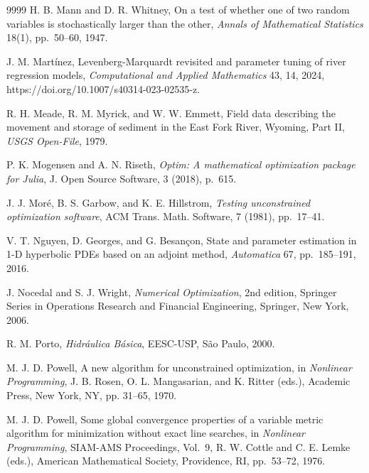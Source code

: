 \documentclass{article}
\begin{document}
\begin{thebibliography}{9999}
 H. B. Mann and D. R. Whitney, On a test of whether one of two random
variables is stochastically larger than the other, {\it Annals of Mathematical Statistics} 18(1), pp.~50--60, 1947.

 J. M. Mart\'inez, Levenberg-Marquardt revisited and parameter tuning of
river regression models, {\it Computational and Applied Mathematics} 43, 14, 2024,
https://doi.org/10.1007/s40314-023-02535-z.

 R. H. Meade, R. M. Myrick, and W. W. Emmett, Field data describing the movement and storage of sediment
in the East Fork River, Wyoming, Part II, {\it USGS Open-File}, 1979.

 P. K. Mogensen and A. N. Riseth, \emph{Optim: A mathematical optimization
 	package for Julia}, J. Open Source Software, 3 (2018), p.~615.

J. J. Mor\'e, B. S. Garbow, and K. E. Hillstrom, \emph{Testing
	unconstrained optimization software}, ACM Trans. Math. Software, 7 (1981),
pp.~17--41.

 V. T. Nguyen, D. Georges, and G. Besan\c{c}on, State and parameter estimation
 in 1-D hyperbolic PDEs based on an adjoint method, {\it Automatica} 67, pp.~185--191, 2016.

 J. Nocedal and S. J. Wright, \textit{Numerical Optimization}, 2nd
 edition, Springer Series in Operations Research and Financial Engineering, Springer, New York, 2006.

 R. M. Porto, {\it Hidráulica Básica}, EESC-USP,
S\~{a}o Paulo, 2000. 


% 
%


 M. J. D. Powell, A new algorithm for unconstrained optimization, in
 {\it Nonlinear Programming}, J. B. Rosen, O. L. Mangasarian, and K. Ritter (eds.), Academic
 Press, New York, NY, pp. 31--65, 1970.

 M. J. D. Powell, Some global convergence properties of a variable
 metric algorithm for minimization without exact line searches, in {\it Nonlinear
 Programming}, SIAM-AMS Proceedings, Vol.~9, R. W. Cottle and C. E. Lemke (eds.),
 American Mathematical Society, Providence, RI, pp.~53--72, 1976.


\end{thebibliography}
\end{document}
